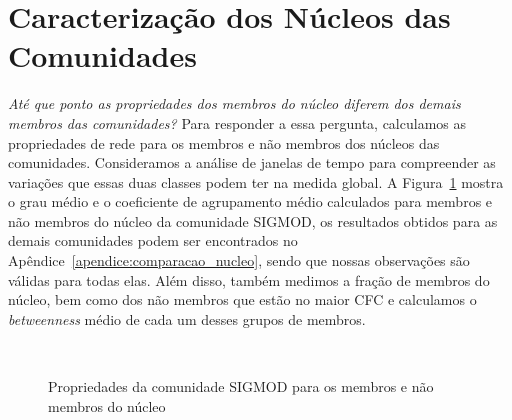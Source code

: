 \section{Caracterização dos Núcleos das Comunidades}\label{sub:vs}

\textit{Até que ponto as propriedades dos membros do núcleo diferem dos demais membros das comunidades?} Para responder a essa 
pergunta, calculamos as propriedades de rede para os membros e não membros dos núcleos das comunidades. Consideramos 
a análise de janelas de tempo para compreender as variações que essas duas classes podem ter na medida global. 
A Figura~\ref{fig:metrics_comparing_core_community} mostra o grau médio e o coeficiente de agrupamento médio calculados para 
membros e não membros do núcleo da comunidade SIGMOD, os resultados obtidos para as demais comunidades podem ser encontrados 
no Apêndice~\ref{apendice:comparacao_nucleo}, sendo que nossas observações são válidas para todas elas. Além disso, 
também medimos a fração de membros do núcleo, bem como dos não membros que estão no maior CFC e calculamos 
o \textit{betweenness} médio de cada um desses grupos de membros.


\begin{figure}[!htb]
  \begin{center}
  \\
  \end{center}
  \caption{Propriedades da comunidade SIGMOD para os membros e não membros do núcleo}
  \label{fig:metrics_comparing_core_community}
\end{figure}

